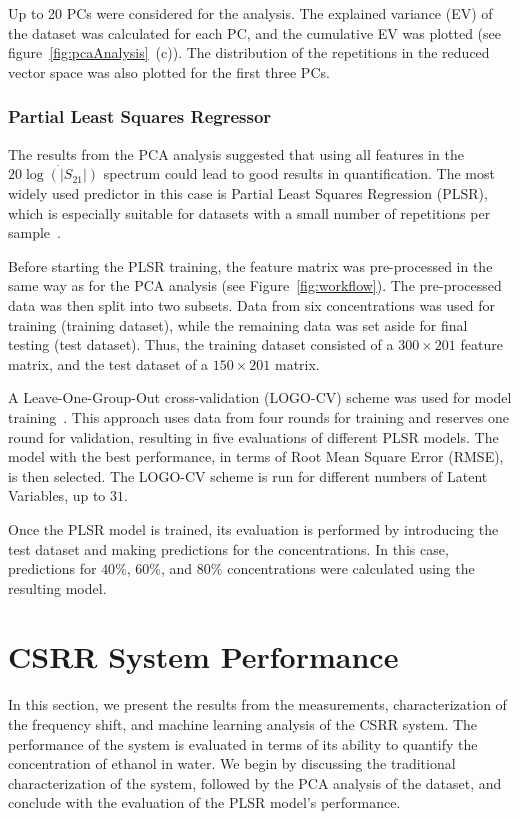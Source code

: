 \documentclass[journal,twoside,web]{ieeecolor}
\begin{document}
Up to 20 PCs were considered for the analysis. The explained variance (EV) of the dataset was calculated for each PC, and the cumulative EV was plotted (see figure~\ref{fig:pcaAnalysis}~(c)). The distribution of the repetitions in the reduced vector space was also plotted for the first three PCs.  

\subsubsection{Partial Least Squares Regressor}
\label{sssec:pls}

The results from the PCA analysis suggested that using all features in the $20\dot{\log\left(|S_{21}|\right)}$ spectrum could lead to good results in quantification. The most widely used predictor in this case is Partial Least Squares Regression (PLSR), which is especially suitable for datasets with a small number of repetitions per sample~\cite{Wold2001}.

Before starting the PLSR training, the feature matrix was pre-processed in the same way as for the PCA analysis (see Figure~\ref{fig:workflow}). The pre-processed data was then split into two subsets. Data from six concentrations was used for training (training dataset), while the remaining data was set aside for final testing (test dataset). Thus, the training dataset consisted of a $300 \times 201$ feature matrix, and the test dataset of a $150 \times 201$ matrix.

A Leave-One-Group-Out cross-validation (LOGO-CV) scheme was used for model training~\cite{Filzmoser2009}. This approach uses data from four rounds for training and reserves one round for validation, resulting in five evaluations of different PLSR models. The model with the best performance, in terms of Root Mean Square Error (RMSE), is then selected. The LOGO-CV scheme is run for different numbers of Latent Variables, up to $31$.

Once the PLSR model is trained, its evaluation is performed by introducing the test dataset and making predictions for the concentrations. In this case, predictions for $40\%$, $60\%$, and $80\%$ concentrations were calculated using the resulting model.

\section{CSRR System Performance}
\label{sec:csrrPerformance}
In this section, we present the results from the measurements, characterization of the frequency shift, and machine learning analysis of the CSRR system. The performance of the system is evaluated in terms of its ability to quantify the concentration of ethanol in water. We begin by discussing the traditional characterization of the system, followed by the PCA analysis of the dataset, and conclude with the evaluation of the PLSR model's performance.
\end{document}
